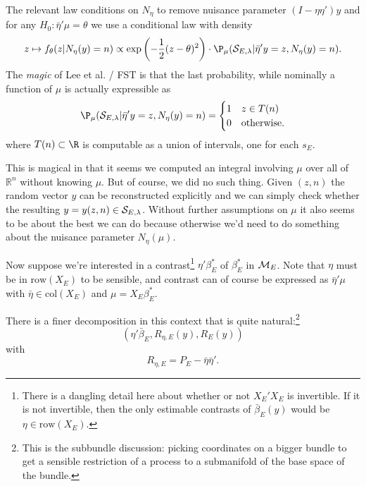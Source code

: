 \documentclass{article}
\newcommand{\OLS}{\bar{\beta}}
\begin{document}
        The relevant law conditions on $N_{\eta}$ to remove nuisance
        parameter $(I-\eta\eta')y$ and for any
        $H_0:\bar{\eta}'\mu=\theta$ we use a conditional law with
        density
        \begin{equation}
          \label{eq:selective:density}
        z \mapsto f_{\theta}(z | N_{\eta}(y)=n) \propto \exp
        \left(-\frac{1}{2}(z-\theta)^2 \right) \cdot \P_{\mu}({\cal
          S}_{E,\lambda} | \bar{\eta}'y=z, N_{\eta}(y)=n).
        \end{equation}
        The {\em magic} of Lee et al. / FST is that the last
        probability, while nominally a function of $\mu$ is actually
        expressible as
        \begin{equation}
          \label{eq:prob:selection}
        \P_{\mu}({\cal S}_{E,\lambda} | \bar{\eta}'y=z, N_{\eta}(y)=n) =
        \begin{cases}
          1 & z \in T(n) \\ 0 & \text{otherwise.}
          \end{cases}
        \end{equation}
        where $T(n) \subset \R$ is computable as a union of intervals,
        one for each $s_E$.

        This is magical in that it seems we computed an integral
        involving $\mu$ over all of $\mathbb{R}^n$ without knowing
        $\mu$. But of course, we did no such thing.  Given $(z,n)$ the
        random vector $y$ can be reconstructed explicitly and we can
        simply check whether the resulting $y=y(z,n) \in {\cal S}_{E,\lambda}$.
        Without further assumptions on $\mu$ it also seems to be about
        the best we can do because otherwise we'd need to do something
        about the nuisance parameter $N_{\eta}(\mu)$.

        Now suppose we're interested in a contrast\footnote{There is a dangling
        detail here about whether or not $X_E'X_E$ is invertible. If it is not invertible,
        then the only estimable contrasts of $\OLS_E(y)$ would be $\eta \in \text{row}(X_E)$.} $\eta'\beta_E^*$
        of
        $\beta_E^*$ in ${\cal M}_E$. Note that $\eta$ must be in
        $\text{row}(X_E)$ to be sensible, and contrast can of course
        be expressed as $\bar{\eta}'\mu$ with $\bar{\eta} \in \text{col}(X_E)$ and
        $\mu=X_E\beta_E^*$.
        
        There is a finer decomposition in this context that is quite natural:\footnote{This is the
        subbundle discussion: picking coordinates on a bigger bundle
        to get a sensible restriction of a process to a submanifold of
        the base space of the bundle.}
        $$ (\eta'\OLS_E, R_{\eta,E}(y), R_E(y)) 
        $$ with
        $$ R_{\eta,E} = P_E - \bar{\eta}\bar{\eta}'.
        $$
\end{document}
